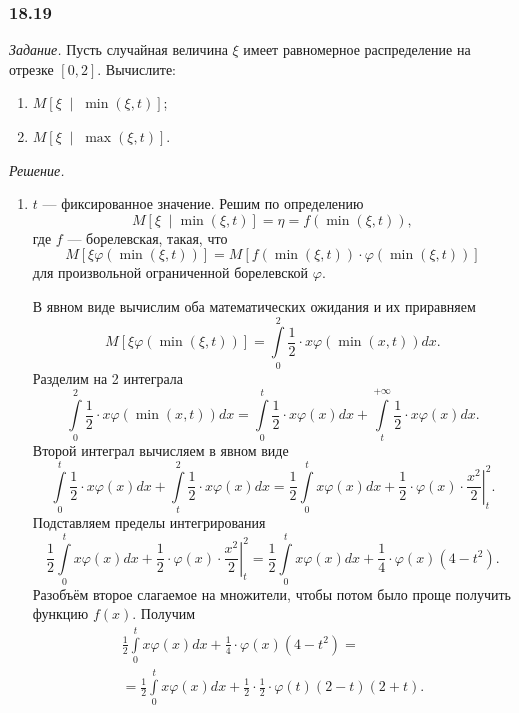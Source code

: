 \subsubsection*{18.19}

\textit{Задание.}
Пусть случайная величина $ \xi $ имеет равномерное распределение на отрезке $ \left[ 0, 2 \right] $.
Вычислите:
\begin{enumerate}[label=\alph*)]
  \item $M \left[ \xi \; \middle| \; \min \left( \xi, t \right) \right] $;
  \item $M \left[ \xi \; \middle| \; \max \left( \xi, t \right) \right] $.
\end{enumerate}

\textit{Решение.}
\begin{enumerate}[label=\alph*)]
  \item $t$ --- фиксированное значение.
  Решим по определению
  $$M \left[ \xi \; \middle| \min \left( \xi, t \right) \right] =
    \eta =
    f \left( \min \left( \xi, t \right) \right),$$
  где $f$ --- борелевская, такая,
  что
  $$M \left[ \xi \varphi \left( \min \left( \xi, t \right) \right) \right] =
    M \left[
      f \left( \min \left( \xi, t \right) \right) \cdot
      \varphi \left( \min \left( \xi, t \right) \right)
    \right] $$
  для произвольной ограниченной борелевской $ \varphi $.

  В явном виде вычислим оба математических ожидания и их приравняем
  $$M \left[ \xi \varphi \left( \min \left( \xi, t \right) \right) \right] =
    \int \limits_0^2 \frac{1}{2} \cdot x \varphi \left( \min \left( x, t \right) \right) dx.$$
  Разделим на 2 интеграла
  $$ \int \limits_0^2 \frac{1}{2} \cdot x \varphi \left( \min \left( x, t \right) \right) dx =
    \int \limits_0^t \frac{1}{2} \cdot x  \varphi \left( x \right) dx +
    \int \limits_t^{+ \infty } \frac{1}{2} \cdot x \varphi \left( x \right) dx.$$
  Второй интеграл вычисляем в явном виде
  $$ \int \limits_0^t \frac{1}{2} \cdot x  \varphi \left( x \right) dx +
    \int \limits_t^2 \frac{1}{2} \cdot x \varphi \left( x \right) dx =
    \frac{1}{2} \int \limits_0^t x \varphi \left( x \right) dx +
    \left. \frac{1}{2} \cdot \varphi \left( x \right) \cdot \frac{x^2}{2} \right|_t^2.$$
  Подставляем пределы интегрирования
  $$ \frac{1}{2} \int \limits_0^t x \varphi \left( x \right) dx +
    \left. \frac{1}{2} \cdot \varphi \left( x \right) \cdot \frac{x^2}{2} \right|_t^2 =
    \frac{1}{2} \int \limits_0^t x \varphi \left( x \right) dx +
    \frac{1}{4} \cdot \varphi \left( x \right) \left( 4 - t^2 \right).$$
  Разобъём второе слагаемое на множители,
  чтобы потом было проще получить функцию $f \left( x \right) $.
  Получим
  \begin{equation*}
    \begin{split}
      \frac{1}{2} \int \limits_0^t x \varphi \left( x \right) dx +
      \frac{1}{4} \cdot \varphi \left( x \right) \left( 4 - t^2 \right) = \\
      = \frac{1}{2} \int \limits_0^t x \varphi \left( x \right) dx +
      \frac{1}{2} \cdot \frac{1}{2} \cdot
      \varphi \left( t \right) \left( 2 - t \right) \left( 2 + t \right).
    \end{split}
  \end{equation*}


\end{enumerate}
